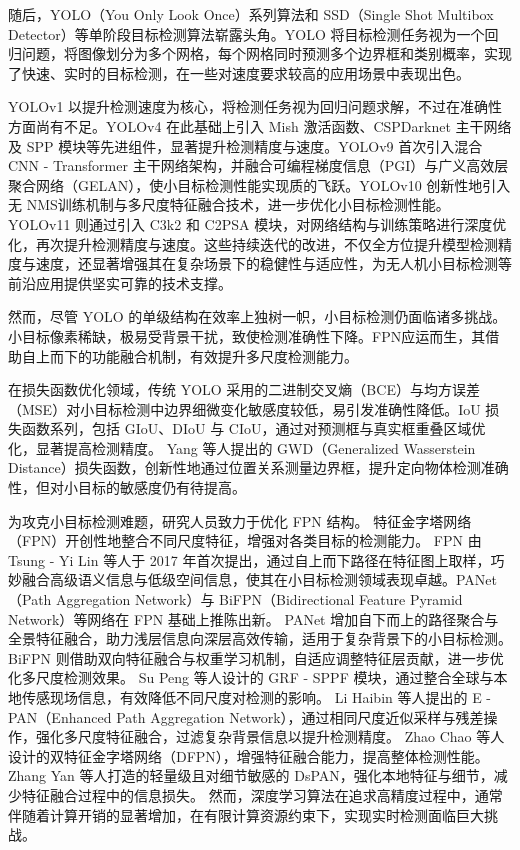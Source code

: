 随后，YOLO（You Only Look Once）\cite{yolov1, yolov2, yolov3, yolov4, yolov6, yolov7, yolov8, yolov9, yolov10, yolov11}系列算法和 SSD（Single Shot Multibox Detector）\cite{ssd, dssd}等单阶段目标检测算法崭露头角。YOLO 将目标检测任务视为一个回归问题，将图像划分为多个网格，每个网格同时预测多个边界框和类别概率，实现了快速、实时的目标检测，在一些对速度要求较高的应用场景中表现出色。

YOLOv1 以提升检测速度为核心，将检测任务视为回归问题求解，不过在准确性方面尚有不足。YOLOv4 在此基础上引入 Mish 激活函数、CSPDarknet 主干网络\cite{csp}及 SPP 模块等先进组件，显著提升检测精度与速度。YOLOv9 首次引入混合 CNN - Transformer 主干网络架构，并融合可编程梯度信息（PGI）与广义高效层聚合网络（GELAN），使小目标检测性能实现质的飞跃。YOLOv10 创新性地引入无 NMS训练机制与多尺度特征融合技术，进一步优化小目标检测性能。YOLOv11 则通过引入 C3k2 和 C2PSA 模块，对网络结构与训练策略进行深度优化，再次提升检测精度与速度。这些持续迭代的改进，不仅全方位提升模型检测精度与速度，还显著增强其在复杂场景下的稳健性与适应性，为无人机小目标检测等前沿应用提供坚实可靠的技术支撑。

然而，尽管 YOLO 的单级结构在效率上独树一帜，小目标检测仍面临诸多挑战。小目标像素稀缺，极易受背景干扰，致使检测准确性下降。FPN\cite{fpn}应运而生，其借助自上而下的功能融合机制，有效提升多尺度检测能力。

在损失函数优化领域，传统 YOLO 采用的二进制交叉熵（BCE）与均方误差（MSE）\cite{mse}对小目标检测中边界细微变化敏感度较低，易引发准确性降低。IoU 损失函数系列，包括 GIoU\cite{giou}、DIoU 与 CIoU\cite{diou}，通过对预测框与真实框重叠区域优化，显著提高检测精度。
Yang 等人\cite{gwd}提出的 GWD（Generalized Wasserstein Distance）损失函数，创新性地通过位置关系测量边界框，提升定向物体检测准确性，但对小目标的敏感度仍有待提高。

为攻克小目标检测难题，研究人员致力于优化 FPN 结构。
特征金字塔网络（FPN）开创性地整合不同尺度特征，增强对各类目标的检测能力。
FPN 由 Tsung - Yi Lin 等人于 2017 年首次提出，通过自上而下路径在特征图上取样，巧妙融合高级语义信息与低级空间信息，使其在小目标检测领域表现卓越。PANet（Path Aggregation Network）\cite{pan}与 BiFPN（Bidirectional Feature Pyramid Network）\cite{bifpn}等网络在 FPN 基础上推陈出新。
PANet 增加自下而上的路径聚合与全景特征融合，助力浅层信息向深层高效传输，适用于复杂背景下的小目标检测。
BiFPN 则借助双向特征融合与权重学习机制，自适应调整特征层贡献，进一步优化多尺度检测效果。
Su Peng 等人\cite{mod-yolo}设计的 GRF - SPPF 模块，通过整合全球与本地传感现场信息，有效降低不同尺度对检测的影响。
Li Haibin 等人\cite{yolo-pl}提出的 E - PAN（Enhanced Path Aggregation Network），通过相同尺度近似采样与残差操作，强化多尺度特征融合，过滤复杂背景信息以提升检测精度。
Zhao Chao 等人\cite{rdd-yolo}设计的双特征金字塔网络（DFPN），增强特征融合能力，提高整体检测性能。
Zhang Yan 等人\cite{dsp-yolo}打造的轻量级且对细节敏感的 DsPAN，强化本地特征与细节，减少特征融合过程中的信息损失。
然而，深度学习算法在追求高精度过程中，通常伴随着计算开销的显著增加，在有限计算资源约束下，实现实时检测面临巨大挑战。


